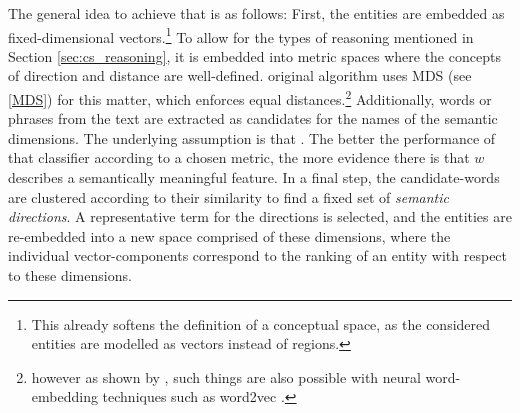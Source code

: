 The general idea to achieve that is as follows: First, the entities %
are embedded as fixed-dimensional vectors.\footnote{This already softens the definition of a conceptual space, as the considered entities are modelled as vectors instead of regions.} %
To allow for the types of reasoning mentioned in Section \ref{sec:cs_reasoning}, %
it is embedded into metric spaces where the concepts of direction and distance are well-defined.  original algorithm uses MDS (see \ref{MDS}) for this matter, which enforces equal distances.\footnote{however as shown by \textcite{Mikolov:Regularities}, such things are also possible with neural word-embedding techniques such as word2vec \cite{Mikolov2013}.}%
Additionally, words or phrases from the text are extracted as candidates for the names of the semantic dimensions. The underlying assumption is that  \cite[3574]{Alshaikh2020}. The better the performance of that classifier according to a chosen metric, the more evidence there is that $w$ describes a semantically meaningful feature. 
In a final step, the candidate-words are clustered according to their similarity to find a fixed set of \emph{semantic directions}. A representative term for the directions is selected, and the entities are re-embedded into a new space comprised of these dimensions, where the individual vector-components correspond to the ranking of an entity with respect to these dimensions.
\newline


